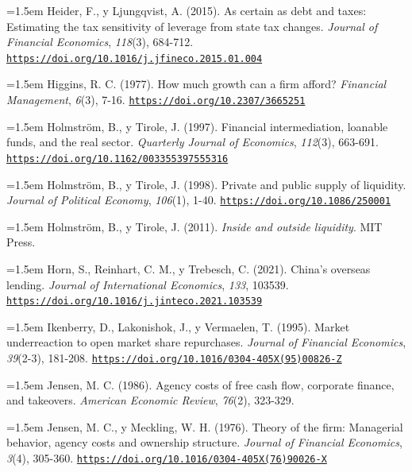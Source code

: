 \documentclass[10pt,a4paper]{article}
\begin{document}
\noindent\hangindent=1.5em Heider, F., y Ljungqvist, A. (2015). As certain as debt and taxes: Estimating the tax sensitivity of leverage from state tax changes. \textit{Journal of Financial Economics}, \textit{118}(3), 684-712. \href{https://doi.org/10.1016/j.jfineco.2015.01.004}{\nolinkurl{https://doi.org/10.1016/j.jfineco.2015.01.004}}

\noindent\hangindent=1.5em Higgins, R. C. (1977). How much growth can a firm afford? \textit{Financial Management}, \textit{6}(3), 7-16. \href{https://doi.org/10.2307/3665251}{\nolinkurl{https://doi.org/10.2307/3665251}}

\noindent\hangindent=1.5em Holmström, B., y Tirole, J. (1997). Financial intermediation, loanable funds, and the real sector. \textit{Quarterly Journal of Economics}, \textit{112}(3), 663-691. \href{https://doi.org/10.1162/003355397555316}{\nolinkurl{https://doi.org/10.1162/003355397555316}}

\noindent\hangindent=1.5em Holmström, B., y Tirole, J. (1998). Private and public supply of liquidity. \textit{Journal of Political Economy}, \textit{106}(1), 1-40. \href{https://doi.org/10.1086/250001}{\nolinkurl{https://doi.org/10.1086/250001}}

\noindent\hangindent=1.5em Holmström, B., y Tirole, J. (2011). \textit{Inside and outside liquidity}. MIT Press.

\noindent\hangindent=1.5em Horn, S., Reinhart, C. M., y Trebesch, C. (2021). China's overseas lending. \textit{Journal of International Economics}, \textit{133}, 103539. \href{https://doi.org/10.1016/j.jinteco.2021.103539}{\nolinkurl{https://doi.org/10.1016/j.jinteco.2021.103539}}

\noindent\hangindent=1.5em Ikenberry, D., Lakonishok, J., y Vermaelen, T. (1995). Market underreaction to open market share repurchases. \textit{Journal of Financial Economics}, \textit{39}(2-3), 181-208. \href{https://doi.org/10.1016/0304-405X(95)00826-Z}{\nolinkurl{https://doi.org/10.1016/0304-405X(95)00826-Z}}

\noindent\hangindent=1.5em Jensen, M. C. (1986). Agency costs of free cash flow, corporate finance, and takeovers. \textit{American Economic Review}, \textit{76}(2), 323-329.

\noindent\hangindent=1.5em Jensen, M. C., y Meckling, W. H. (1976). Theory of the firm: Managerial behavior, agency costs and ownership structure. \textit{Journal of Financial Economics}, \textit{3}(4), 305-360. \href{https://doi.org/10.1016/0304-405X(76)90026-X}{\nolinkurl{https://doi.org/10.1016/0304-405X(76)90026-X}}
\end{document}
